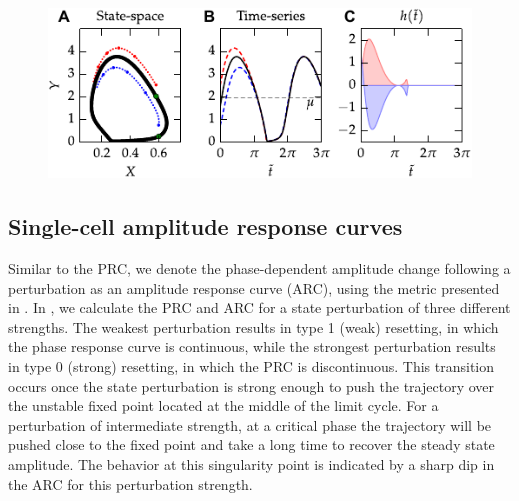 \begin{figure}[tbp]
  \begin{center}
    \includegraphics[width=.75\textwidth]{chap5/figures/figure_1_b.pdf}
  \end{center}
  \label{fig:51b}
\end{figure}

\subsection{Single-cell amplitude response curves}
Similar to the PRC, we denote the phase-dependent amplitude change following a perturbation as an amplitude response curve (ARC), using the metric presented in .
In , we calculate the PRC and ARC for a state perturbation of three different strengths.
The weakest perturbation results in type 1 (weak) resetting, in which the phase response curve is continuous, while the strongest perturbation results in type 0 (strong) resetting, in which the PRC is discontinuous.
This transition occurs once the state perturbation is strong enough to push the trajectory over the unstable fixed point located at the middle of the limit cycle.
For a perturbation of intermediate strength, at a critical phase the trajectory will be pushed close to the fixed point and take a long time to recover the steady state amplitude.
The behavior at this singularity point is indicated by a sharp dip in the ARC for this perturbation strength.

